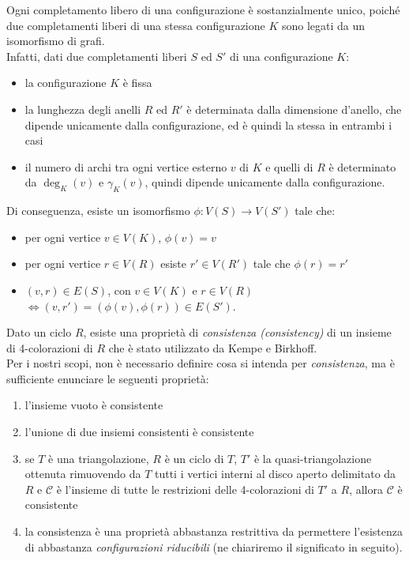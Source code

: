 \documentclass[a4paper,12pt,titlepage]{report}
\begin{document}
    \noindent Ogni completamento libero di una configurazione è sostanzialmente unico, poiché due completamenti liberi di una stessa configurazione $K$ sono legati da un isomorfismo di grafi.
    \\Infatti, dati due completamenti liberi $S$ ed $S'$ di una configurazione $K$:
    \begin{itemize}
    	\item la configurazione $K$ è fissa
    	\item la lunghezza degli anelli $R$ ed $R'$ è determinata dalla dimensione d'anello, che dipende unicamente dalla configurazione, ed è quindi la stessa in entrambi i casi
    	\item il numero di archi tra ogni vertice esterno $v$ di $K$ e quelli di $R$ è determinato da $\deg_K(v)$ e $\gamma_K(v)$, quindi dipende unicamente dalla configurazione.
    \end{itemize}
    Di conseguenza, esiste un isomorfismo $\phi \colon V(S) \to V(S')$ tale che:
    \begin{itemize}
    	\item per ogni vertice $v \in V(K)$, $\phi(v) = v$
    	\item per ogni vertice $r \in V(R)$ esiste $r' \in V(R')$ tale che $\phi(r) = r'$
    	\item $(v,r) \in E(S)$, con $v \in V(K)$ e $r \in V(R)$ $\iff (v,r') = (\phi(v), \phi(r)) \in E(S')$.
    \end{itemize}
    \vspace{0.5cm}
    Dato un ciclo $R$, esiste una proprietà di \emph{consistenza (consistency)} di un insieme di 4-colorazioni di $R$ che è stato utilizzato da Kempe e Birkhoff.
    \\Per i nostri scopi, non è necessario definire cosa si intenda per \emph{consistenza}, ma è sufficiente enunciare le seguenti proprietà:
    \begin{enumerate}
    	\item  l'insieme vuoto è consistente
    	\item l'unione di due insiemi consistenti è consistente
    	\item se $T$ è una triangolazione, $R$ è un ciclo di $T$, $T'$ è la quasi-triangolazione ottenuta rimuovendo da $T$ tutti i vertici interni al disco aperto delimitato da $R$ e $\mathcal{C}$ è l'insieme di tutte le restrizioni delle 4-colorazioni di $T'$ a $R$, allora $\mathcal{C}$ è consistente
    	\item la consistenza è una proprietà abbastanza restrittiva da permettere l'esistenza di abbastanza \emph{configurazioni riducibili} (ne chiariremo il significato in seguito).
    \end{enumerate}
\end{document}
